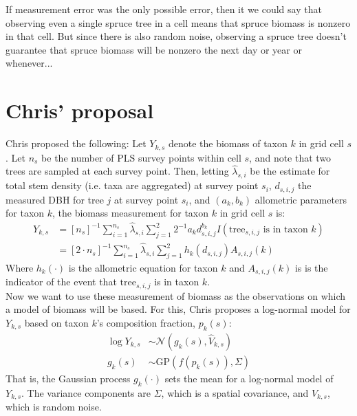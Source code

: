 \documentclass[authoryear, review, 11pt]{elsarticle}
\begin{document}
If measurement error was the only possible error, then it we could say that observing even a single spruce tree in a cell means that spruce biomass is nonzero in that cell. But since there is also random noise, observing a spruce tree doesn't guarantee that spruce biomass will be nonzero the next day or year or whenever...\\


\section{Chris' proposal}
Chris proposed the following:\*
Let $Y_{k,s}$ denote the biomass of taxon $k$ in grid cell $s$. Let $n_s$ be the number of PLS survey points within cell $s$, and note that two trees are sampled at each survey point. Then, letting $\hat{\lambda}_{s,i}$ be the estimate for total stem density (i.e. taxa are aggregated) at survey point $s_i$, $d_{s,i,j}$ the measured DBH for tree $j$ at survey point $s_i$, and $\left(a_k, b_k\right)$ allometric parameters for taxon $k$, the biomass measurement for taxon $k$ in grid cell $s$ is:\*
\begin{equation*}
  \begin{split}
    Y_{k,s} &= \left[ n_s \right]^{-1} \sum\limits_{i=1}^{n_s} \hat{\lambda}_{s,i} \sum\limits_{j=1}^{2} 2^{-1} a_k d_{s,i,j}^{b_k} I(\text{tree}_{s,i,j} \text{ is in taxon }k)\\
    &= \left[ 2 \cdot n_s \right]^{-1} \sum\limits_{i=1}^{n_s} \hat{\lambda}_{s,i} \sum\limits_{j=1}^{2} h_k(d_{s,i,j}) A_{s,i,j}(k)
  \end{split}
\end{equation*}
Where $h_k(\cdot)$ is the allometric equation for taxon $k$ and $A_{s,i,j}(k)$ is is the indicator of the event that $\text{tree}_{s,i,j}$ is in taxon $k$.\\

Now we want to use these measurement of biomass as the observations on which a model of biomass will be based. For this, Chris proposes a log-normal model for $Y_{k,s}$ based on taxon $k$'s composition fraction, $p_k(s)$:\*
\begin{equation*}
  \begin{split}
    \log Y_{k,s} &\sim \mathcal{N}\left(g_k(s), \hat{V}_{k,s}\right)\\
    g_k(s) &\sim \text{GP}\left(f(p_k(s)), \Sigma \right)
  \end{split}
\end{equation*}
That is, the Gaussian process $g_k(\cdot)$ sets the mean for a log-normal model of $Y_{k,s}$. The variance components are $\Sigma$, which is a spatial covariance, and $V_{k,s}$, which is random noise.\\
\end{document}
